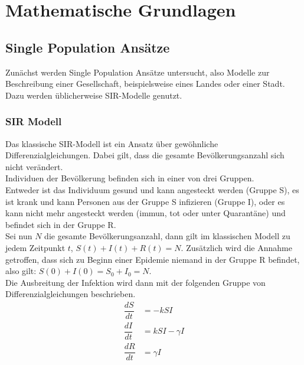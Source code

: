\section{Mathematische Grundlagen}
\subsection{Single Population Ansätze}\label{ssec:spa}
\ellen
Zunächst werden Single Population Ansätze untersucht, also Modelle zur Beschreibung einer Gesellschaft, beispielsweise eines Landes oder einer Stadt. Dazu werden üblicherweise SIR-Modelle genutzt.

\subsubsection{SIR Modell}

Das klassische SIR-Modell ist ein Ansatz über gewöhnliche Differenzialgleichungen. Dabei gilt, dass die gesamte Bevölkerungsanzahl sich nicht verändert.\\
Individuen der Bevölkerung befinden sich in einer von drei Gruppen.\\
Entweder ist das Individuum gesund und kann angesteckt werden (Gruppe S), es ist krank und kann Personen aus der Gruppe S infizieren (Gruppe I), oder es kann nicht mehr angesteckt werden (immun, tot oder unter Quarantäne) und befindet sich in der Gruppe R.\\
Sei nun $N$ die gesamte Bevölkerungsanzahl, dann gilt im klassischen Modell zu jedem Zeitpunkt $t$, $S(t)+I(t)+R(t) = N$. Zusätzlich wird die Annahme getroffen, dass sich zu Beginn einer Epidemie niemand in der Gruppe R befindet, also gilt: $S(0)+I(0)= S_0+I_0 = N$.\\
Die Ausbreitung der Infektion wird dann mit der folgenden Gruppe von Differenzialgleichungen beschrieben.
\begin{align}
\dfrac{dS}{dt} &= -kSI\\
\dfrac{dI}{dt} &= kSI- \gamma I\\
\dfrac{dR}{dt} &= \gamma I
\end{align}

